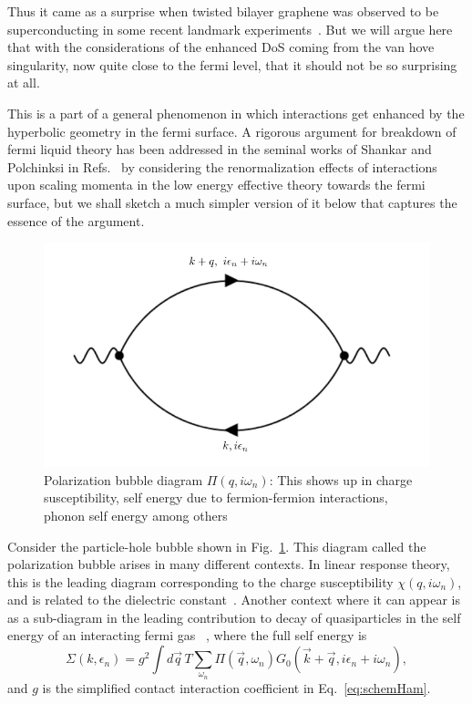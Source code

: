 \par
Thus it came as a surprise when twisted bilayer graphene was observed to be superconducting in some recent landmark experiments~\cite{Cao2018,Caocorrelated2018,oh2021evidence,lisi2021observation}. But we will argue here that with the considerations of the enhanced DoS coming from the van hove singularity, now quite close to the fermi level, that it should not be so surprising at all. 

\par
This is a part of a general phenomenon in which interactions get enhanced by the hyperbolic geometry in the fermi surface. A rigorous argument for breakdown of fermi liquid theory has been addressed in the seminal works of Shankar and Polchinksi in Refs.~\cite{shankar1991renormalization,shankar1994renormalization,polchinski1992effective} by considering the renormalization effects of interactions upon scaling momenta in the low energy effective theory towards the fermi surface, but we shall sketch a much simpler version of it below that captures the essence of the argument. 

\begin{figure}[h!]
    \centering
    \includegraphics[width=0.5\linewidth]{figures/introduction/LabeledChiQOmdiagram.pdf}
    \caption{Polarization bubble diagram $\Pi(q,i\omega_n)$: This shows up in charge susceptibility, self energy due to fermion-fermion interactions, phonon self energy among others}
    \label{fig:PHbubblediagram}
\end{figure}
Consider the particle-hole bubble shown in Fig.~\ref{fig:PHbubblediagram}. This diagram called the polarization bubble arises in many different contexts. In linear response theory, this is the leading diagram corresponding to the charge susceptibility $\chi(q,i\omega_n)$, and is related to the dielectric constant~\cite{coleman2015introduction}. Another context where it can appear is as a sub-diagram in the leading contribution to decay of quasiparticles in the self energy of an interacting fermi gas ~\cite{Sachdev_2011}, where the full self energy is
\begin{equation}
\Sigma(k,\epsilon_n) = g^2\int d\vec{q} \,T\sum_{\omega_n}\Pi(\vec{q},\omega_n)G_0(\vec{k}+\vec{q},i\epsilon_n + i\omega_n), 
\end{equation}
and $g$ is the simplified contact interaction coefficient in Eq.~\eqref{eq:schemHam}.

